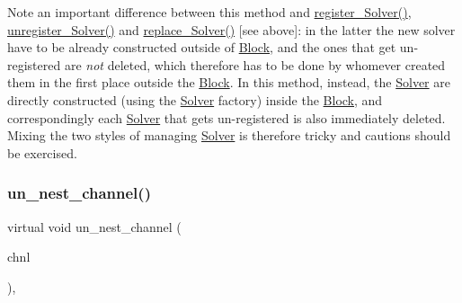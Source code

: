 Note an important difference between this method and \mbox{\hyperlink{class_s_m_spp__di__unipi__it_1_1_block_a4bf9d1856367faf430d0143a6ee55655}{register\+\_\+\+Solver()}}, \mbox{\hyperlink{class_s_m_spp__di__unipi__it_1_1_block_a1be1159f846ad7809d2d0c5c2311c92e}{unregister\+\_\+\+Solver()}} and \mbox{\hyperlink{class_s_m_spp__di__unipi__it_1_1_block_ae7306554741d39d82838487ae623daed}{replace\+\_\+\+Solver()}} \mbox{[}see above\mbox{]}\+: in the latter the new solver have to be already constructed outside of \mbox{\hyperlink{class_s_m_spp__di__unipi__it_1_1_block}{Block}}, and the ones that get un-\/registered are {\itshape not} deleted, which therefore has to be done by whomever created them in the first place outside the \mbox{\hyperlink{class_s_m_spp__di__unipi__it_1_1_block}{Block}}. In this method, instead, the \mbox{\hyperlink{class_s_m_spp__di__unipi__it_1_1_solver}{Solver}} are directly constructed (using the \mbox{\hyperlink{class_s_m_spp__di__unipi__it_1_1_solver}{Solver}} factory) inside the \mbox{\hyperlink{class_s_m_spp__di__unipi__it_1_1_block}{Block}}, and correspondingly each \mbox{\hyperlink{class_s_m_spp__di__unipi__it_1_1_solver}{Solver}} that gets un-\/registered is also immediately deleted. Mixing the two styles of managing \mbox{\hyperlink{class_s_m_spp__di__unipi__it_1_1_solver}{Solver}} is therefore tricky and cautions should be exercised. \mbox{\label{class_s_m_spp__di__unipi__it_1_1_block_a8f87b193f9ae85d75ed4a3ab798e6fe0}} 
\subsubsection{\texorpdfstring{un\+\_\+nest\+\_\+channel()}{un\_nest\_channel()}}
{\footnotesize\ttfamily virtual void un\+\_\+nest\+\_\+channel (\begin{DoxyParamCaption}\item[{\mbox{\hyperlink{class_s_m_spp__di__unipi__it_1_1_observer_aa9ad8de42ffaf90023bfed5c085ad8bc}{c\+\_\+\+Chnl\+Name}}}]{chnl }\end{DoxyParamCaption})\hspace{0.3cm}{\ttfamily [override]}, {\ttfamily [virtual]}}



